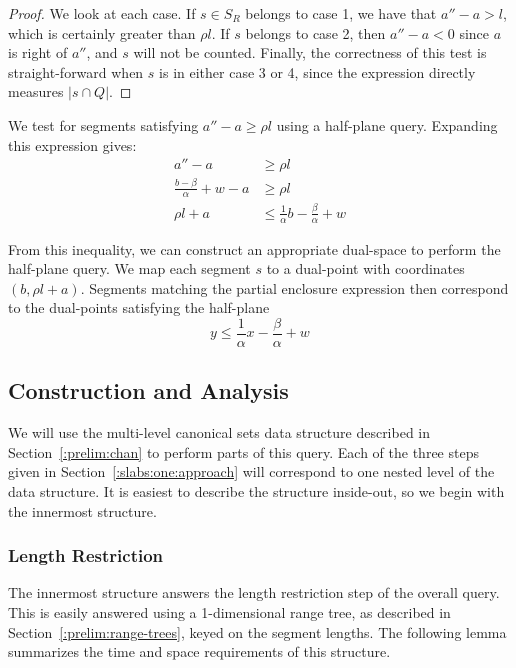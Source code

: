 \begin{proof}
We look at each case. 
If $s \in S_R$ belongs to case 1, we have that $a'' - a > l$, which is certainly greater than $\rho l$. 
If $s$ belongs to case 2, then $a'' - a < 0$ since $a$ is right of $a''$, and $s$ will not be counted.
Finally, the correctness of this test is straight-forward when $s$ is in either case 3 or 4, since the expression directly measures $|s \cap Q|$.
\end{proof}

We test for segments satisfying $a'' - a \geq \rho l$ using a half-plane query.  Expanding this expression gives:
\[
\begin{split}
a'' - a &\geq \rho l \\
%
\frac{b - \beta}{\alpha} + w - a &\geq \rho l \\
%
\rho l + a &\leq \frac{1}{\alpha} b - \frac{\beta}{\alpha} + w
%
\end{split}
\]

From this inequality, we can construct an appropriate dual-space to perform the half-plane query.  
We map each segment $s$ to a dual-point with coordinates $(b, \rho l + a)$. 
Segments matching the partial enclosure expression then correspond to the dual-points satisfying the half-plane 
\[
y \leq \frac{1}{\alpha} x - \frac{\beta}{\alpha} + w
\]

\subsection{Construction and Analysis}
\label{:slabs:one:analysis}

We will use the multi-level canonical sets data structure described in Section~\ref{:prelim:chan} to perform parts of this query.
Each of the three steps given in Section~\ref{:slabs:one:approach} will correspond to one nested level of the data structure.
It is easiest to describe the structure inside-out, so we begin with the innermost structure.


\subsubsection{Length Restriction}

The innermost structure answers the length restriction step of the overall query. This is easily answered using a 1-dimensional range tree, as described in Section~\ref{:prelim:range-trees}, keyed on the segment lengths. The following lemma summarizes the time and space requirements of this structure.

